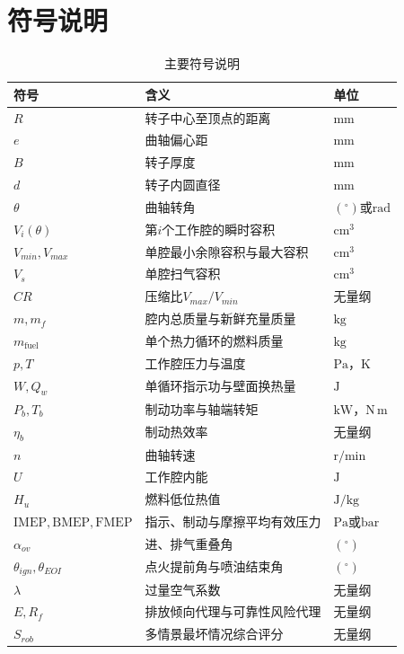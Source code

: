 \documentclass[withoutpreface,bwprint]{cumcmthesis}
\begin{document}
\section{符号说明}
\begin{table}[H]
\centering
\caption{主要符号说明}
\begin{tabularx}{\textwidth}{>{\centering\arraybackslash}p{2.2cm}X>{\centering\arraybackslash}p{2.8cm}}
\toprule
符号 & 含义 & 单位\\
\midrule
$R$ & 转子中心至顶点的距离 & $\mathrm{mm}$\\
$e$ & 曲轴偏心距 & $\mathrm{mm}$\\
$B$ & 转子厚度 & $\mathrm{mm}$\\
$d$ & 转子内圆直径 & $\mathrm{mm}$\\
$\theta$ & 曲轴转角 & $(^\circ)$或$\mathrm{rad}$\\
$V_i(\theta)$ & 第$i$个工作腔的瞬时容积 & $\mathrm{cm^3}$\\
$V_{min},V_{max}$ & 单腔最小余隙容积与最大容积 & $\mathrm{cm^3}$\\
$V_s$ & 单腔扫气容积 & $\mathrm{cm^3}$\\
$CR$ & 压缩比$V_{max}/V_{min}$ & 无量纲\\
$m,m_f$ & 腔内总质量与新鲜充量质量 & $\mathrm{kg}$\\
$m_{\mathrm{fuel}}$ & 单个热力循环的燃料质量 & $\mathrm{kg}$\\
$p,T$ & 工作腔压力与温度 & $\mathrm{Pa}$，$\mathrm{K}$\\
$W,Q_w$ & 单循环指示功与壁面换热量 & $\mathrm{J}$\\
$P_b,T_b$ & 制动功率与轴端转矩 & $\mathrm{kW}$，$\mathrm{N\,m}$\\
$\eta_b$ & 制动热效率 & 无量纲\\
$n$ & 曲轴转速 & $\mathrm{r/min}$\\
$U$ & 工作腔内能 & $\mathrm{J}$\\
$H_u$ & 燃料低位热值 & $\mathrm{J/kg}$\\
$\mathrm{IMEP},\mathrm{BMEP},\mathrm{FMEP}$ & 指示、制动与摩擦平均有效压力 & $\mathrm{Pa}$或$\mathrm{bar}$\\
$\alpha_{ov}$ & 进、排气重叠角 & $(^\circ)$\\
$\theta_{ign},\theta_{EOI}$ & 点火提前角与喷油结束角 & $(^\circ)$\\
$\lambda$ & 过量空气系数 & 无量纲\\
$E,R_f$ & 排放倾向代理与可靠性风险代理 & 无量纲\\
$S_{rob}$ & 多情景最坏情况综合评分 & 无量纲\\
\bottomrule
\end{tabularx}
\end{table}
\end{document}
